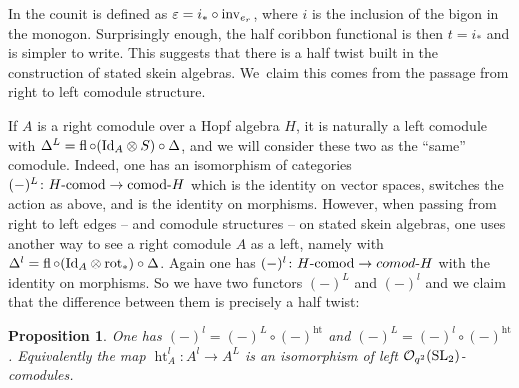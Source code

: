 \documentclass[pdftex]{sigma}%
\numberwithin{equation}{section}
\newtheorem{Proposition}[Theorem]{Proposition}
 { \theoremstyle{definition}
\newtheorem{Definition}[Theorem]{Definition}
\newtheorem{Note}[Theorem]{Note}
\newtheorem{Example}[Theorem]{Example}
\newtheorem{Remark}[Theorem]{Remark} }
\newcommand{\halft}{{\operatorname{ht}}}
\newcommand{\Oq}{\mathcal{O}_{q^2}({\rm SL}_2)}
\begin{document}
\begin{Remark}
In \cite[Section~3.4]{Cos} the counit is defined as $\varepsilon = i_* \circ {\rm inv}_{e_r}$, where $i$ is the inclusion of the bigon in the monogon. Surprisingly enough, the half coribbon functional is then $t = i_*$ and is simpler to write. This suggests that there is a half twist built in the construction of stated skein algebras. We~claim this comes from the passage from right to left comodule structure.
\end{Remark}
If $A$ is a right comodule over a Hopf algebra $H$, it is naturally a left comodule with $\Delta^L = \operatorname{fl} \circ ({\rm Id}_A \otimes S) \circ \Delta$, and we will consider these two as the ``same'' comodule. Indeed, one has an isomorphism of categories $(-)^L\colon H\text{-}{\rm comod} \to {\rm comod}\text{-}H$ which is the identity on vector spaces, switches the action as above, and is the identity on morphisms. However, when passing from right to left edges -- and comodule structures -- on stated skein algebras, one uses another way to see a right comodule $A$ as a left, namely with $\Delta^l = \operatorname{fl} \circ ({\rm Id}_A \otimes \operatorname{rot}_*) \circ \Delta$. Again one has $(-)^l\colon H\text{-}{\rm comod} \to comod\text{-}H$ with the identity on morphisms. So we have two functors $(-)^L$ and $(-)^l$ and we claim that the difference between them is precisely a half twist:

\begin{Proposition}\label{prophtDiffLl}
One has $(-)^l = (-)^L \circ (-)^\halft$ and $(-)^L = (-)^l \circ (-)^\halft$. Equivalently the map $\halft_A^l \colon A^l \to A^L$ is an isomorphism of left $\Oq$-comodules.
\end{Proposition}
\end{document}
